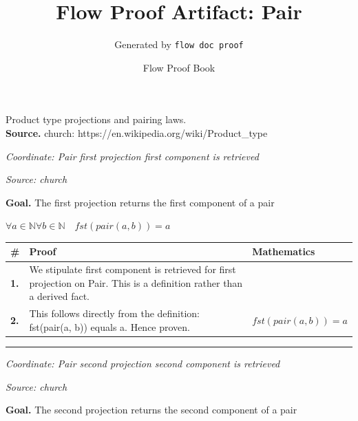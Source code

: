 \documentclass[11pt]{article}
\title{Flow Proof Artifact: Pair}
\author{Generated by \texttt{flow doc proof}}
\date{Flow Proof Book}
\theoremstyle{definition}
\begin{document}
\maketitle
Product type projections and pairing laws.\\[0.5em]
\textbf{Source.} church: https://en.wikipedia.org/wiki/Product\_type\\[0.5em]
\bigskip
{}\par
\smallskip\noindent\textit{Coordinate: Pair \cdot first projection \cdot first component is retrieved}\par
\smallskip\noindent\textit{Source: church}\par
\medskip
\noindent\textbf{Goal.} The first projection returns the first component of a pair\par
\noindent$\displaystyle \forall a \in \mathbb{N} \forall b \in \mathbb{N}\quad fst(pair(a, b)) = a$\par
\medskip
\noindent
\begin{tabular}{@{} >{\raggedright\arraybackslash}p{} >{\raggedright\arraybackslash}p{} >{\raggedleft\arraybackslash}p{} @{}}
\textbf{\#} & \textbf{Proof} & \textbf{Mathematics} \\
\midrule
\textbf{1.} & We stipulate first component is retrieved for first projection on Pair. This is a definition rather than a derived fact. & \\[0.45em]
\textbf{2.} & This follows directly from the definition: fst(pair(a, b)) equals a. Hence proven. & $\displaystyle fst(pair(a, b)) = a$ \\[0.45em]
\bottomrule
\end{tabular}
\label{thm:Pair-first projection-first_component_is_retrieved}
\par\medskip\hrule
\bigskip
{}\par
\smallskip\noindent\textit{Coordinate: Pair \cdot second projection \cdot second component is retrieved}\par
\smallskip\noindent\textit{Source: church}\par
\medskip
\noindent\textbf{Goal.} The second projection returns the second component of a pair\par
\end{document}
